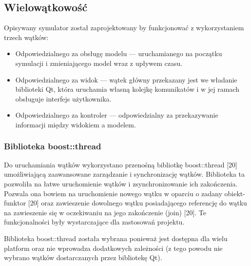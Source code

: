 \subsection{Wielowątkowość}
\par{
Opisywany symulator został zaprojektowany by funkcjonować z wykorzystaniem trzech wątków:
\begin{itemize}
\item Odpowiedzialnego za obsługę modelu --- uruchamianego na początku symulacji i zmieniającego model wraz z upływem czasu.
\item Odpowiedzialnego za widok --- wątek główny przekazany jest we władanie biblioteki Qt, która uruchamia własną kolejkę komunikatów i w jej ramach obsługuje interfejs użytkownika.
\item Odpowiedzialnego za kontroler --- odpowiedzialny za przekazywanie informacji między widokiem a modelem.
\end{itemize} 
}
\subsubsection{Biblioteka boost::thread}
\par{
Do uruchamiania wątków wykorzystano przenośną bibliotkę boost::thread [20] umożliwiającą zaawansowane zarządzanie i synchronizację wątków. Biblioteka ta pozwoliła na łatwe uruchomienie wątków i zsynchronizowanie ich zakończenia. Pozwala ona bowiem na uruchomienie nowego wątku w oparciu o zadany obiekt-funktor [20] oraz zawieszenie dowolnego wątku posiadającego referencję do wątku na zawieszenie się w oczekiwaniu na jego zakończenie (join) [20]. Te funkcjonalności były wystarczające dla zastosowań projektu.
}
\par{
Biblioteka boost::thread została wybrana ponieważ jest dostępna dla wielu platform oraz nie wprowadza dodatkowych zależności (z tego powodu nie wybrano wątków dostarczanych przez bibliotekę Qt).
}

